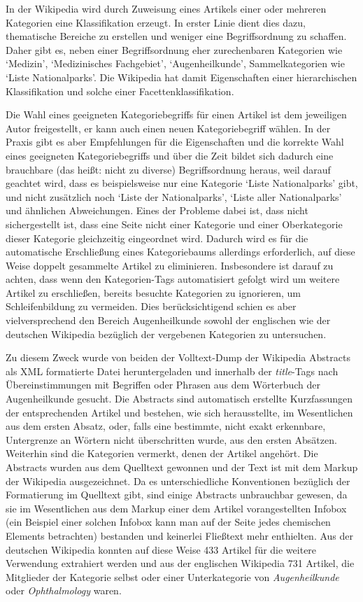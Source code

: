 \documentclass[pagesize,DIV=calc,12pt,draft]{scrreprt}
\begin{document}
In der Wikipedia wird durch Zuweisung eines Artikels einer oder mehreren
Kategorien eine Klassifikation erzeugt. In erster Linie dient dies dazu,
thematische Bereiche zu erstellen und weniger eine Begriffsordnung zu
schaffen. Daher gibt es, neben einer Begriffsordnung eher zurechenbaren
Kategorien wie `Medizin', `Medizinisches Fachgebiet', `Augenheilkunde',
Sammelkategorien wie `Liste Nationalparks'. Die Wikipedia hat damit
Eigenschaften einer hierarchischen Klassifikation und solche einer
Facettenklassifikation.

Die Wahl eines geeigneten Kategoriebegriffs für einen Artikel ist dem
jeweiligen Autor freigestellt, er kann auch einen neuen Kategoriebegriff
wählen. In der Praxis gibt es aber Empfehlungen für die Eigenschaften
und die korrekte Wahl eines geeigneten Kategoriebegriffs und über die
Zeit bildet sich dadurch eine brauchbare (das heißt: nicht zu diverse)
Begriffsordnung heraus, weil darauf geachtet wird, dass es
beispielsweise nur eine Kategorie `Liste Nationalparks' gibt, und nicht
zusätzlich noch `Liste der Nationalparks', `Liste aller Nationalparks'
und ähnlichen Abweichungen. Eines der Probleme dabei ist, dass nicht
sichergestellt ist, dass eine Seite nicht einer Kategorie und einer
Oberkategorie dieser Kategorie gleichzeitig eingeordnet wird. Dadurch
wird es für die automatische Erschließung eines Kategoriebaums
allerdings erforderlich, auf diese Weise doppelt gesammelte Artikel zu
eliminieren. Insbesondere ist darauf zu achten, dass wenn den
Kategorien-Tags automatisiert gefolgt wird um weitere Artikel zu
erschließen, bereits besuchte Kategorien zu ignorieren, um
Schleifenbildung zu vermeiden. Dies berücksichtigend schien es aber
vielversprechend den Bereich Augenheilkunde sowohl der englischen wie
der deutschen Wikipedia bezüglich der vergebenen Kategorien zu
untersuchen.

Zu diesem Zweck wurde von beiden der Volltext-Dump der Wikipedia
Abstracts als XML formatierte Datei heruntergeladen und innerhalb der
\emph{title}-Tags nach Übereinstimmungen mit Begriffen oder Phrasen aus
dem Wörterbuch der Augenheilkunde gesucht. Die Abstracts sind
automatisch erstellte Kurzfassungen der entsprechenden Artikel und
bestehen, wie sich herausstellte, im Wesentlichen aus dem ersten Absatz,
oder, falls eine bestimmte, nicht exakt erkennbare, Untergrenze an
Wörtern nicht überschritten wurde, aus den ersten Absätzen. Weiterhin
sind die Kategorien vermerkt, denen der Artikel angehört. Die Abstracts
wurden aus dem Quelltext gewonnen und der Text ist mit dem Markup der
Wikipedia ausgezeichnet. Da es unterschiedliche Konventionen bezüglich
der Formatierung im Quelltext gibt, sind einige Abstracts unbrauchbar
gewesen, da sie im Wesentlichen aus dem Markup einer dem Artikel
vorangestellten Infobox (ein Beispiel einer solchen Infobox kann man auf
der Seite jedes chemischen Elements betrachten) bestanden und keinerlei
Fließtext mehr enthielten. Aus der deutschen Wikipedia konnten auf diese
Weise 433 Artikel für die weitere Verwendung extrahiert werden und aus
der englischen Wikipedia 731 Artikel, die Mitglieder der Kategorie
selbst oder einer Unterkategorie von \emph{Augenheilkunde} oder
\emph{Ophthalmology} waren.
\end{document}
